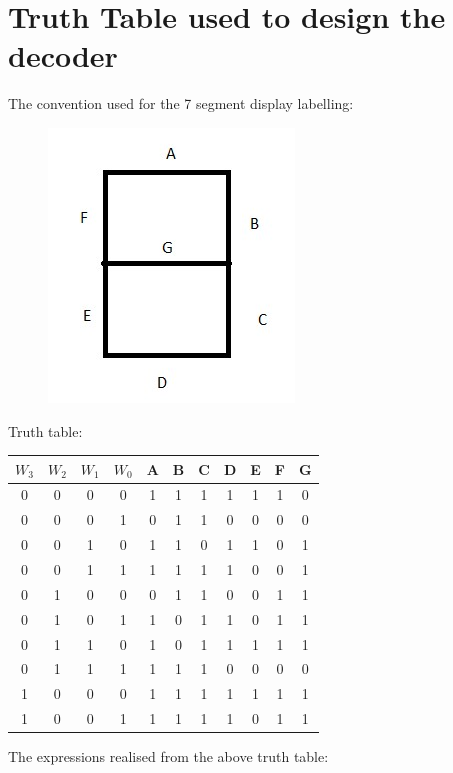 \documentclass[12pt]{article}
\begin{document}
\section*{Truth Table used to design the decoder}
The convention used for the 7 segment display labelling:
\begin{center}
    \begin{figure}[ht]
        \includegraphics{convention.jpg}

    \end{figure}
\end{center}
Truth table:
\begin{center}
    \begin{tabular}{| c | c | c | c || c | c | c | c | c | c | c  |}
        \hline
        $W_3$ & $W_2$ & $W_1$ & $W_0$ & A & B & C & D & E & F & G \\
        \hline
        0     & 0     & 0     & 0     & 1 & 1 & 1 & 1 & 1 & 1 & 0 \\
        \hline
        0     & 0     & 0     & 1     & 0 & 1 & 1 & 0 & 0 & 0 & 0 \\
        \hline
        0     & 0     & 1     & 0     & 1 & 1 & 0 & 1 & 1 & 0 & 1 \\
        \hline
        0     & 0     & 1     & 1     & 1 & 1 & 1 & 1 & 0 & 0 & 1 \\
        \hline
        0     & 1     & 0     & 0     & 0 & 1 & 1 & 0 & 0 & 1 & 1 \\
        \hline
        0     & 1     & 0     & 1     & 1 & 0 & 1 & 1 & 0 & 1 & 1 \\
        \hline
        0     & 1     & 1     & 0     & 1 & 0 & 1 & 1 & 1 & 1 & 1 \\
        \hline
        0     & 1     & 1     & 1     & 1 & 1 & 1 & 0 & 0 & 0 & 0 \\
        \hline
        1     & 0     & 0     & 0     & 1 & 1 & 1 & 1 & 1 & 1 & 1 \\
        \hline
        1     & 0     & 0     & 1     & 1 & 1 & 1 & 1 & 0 & 1 & 1 \\
        \hline
    \end{tabular}
\end{center}
\newpage
The expressions realised from the above truth table: 
\end{document}
